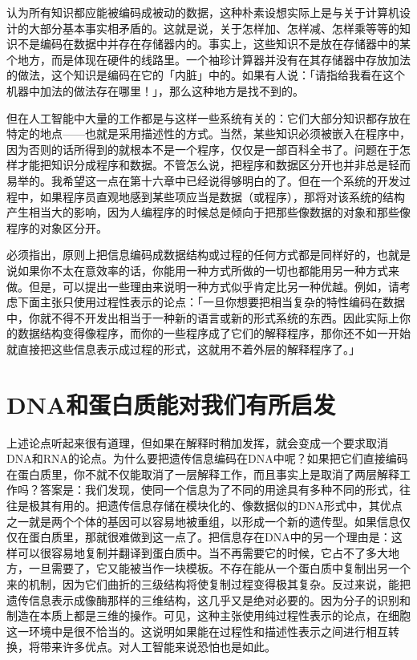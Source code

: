 \documentclass[
  12pt,
  twoside,
  openright,
  oldfontcommands,
]{memoir}
\begin{document}
认为所有知识都应能被编码成被动的数据，这种朴素设想实际上是与关于计算机设计的大部分基本事实相矛盾的。这就是说，关于怎样加、怎样减、怎样乘等等的知识不是编码在数据中并存在存储器内的。事实上，这些知识不是放在存储器中的某个地方，而是体现在硬件的线路里。一个袖珍计算器并没有在其存储器中存放加法的做法，这个知识是编码在它的「内脏」中的。如果有人说：「请指给我看在这个机器中加法的做法存在哪里！」，那么这种地方是找不到的。

但在人工智能中大量的工作都是与这样一些系统有关的：它们大部分知识都存放在特定的地点------也就是采用描述性的方式。当然，某些知识必须被嵌入在程序中，因为否则的话所得到的就根本不是一个程序，仅仅是一部百科全书了。问题在于怎样才能把知识分成程序和数据。不管怎么说，把程序和数据区分开也并非总是轻而易举的。我希望这一点在第十六章中已经说得够明白的了。但在一个系统的开发过程中，如果程序员直观地感到某些项应当是数据（或程序），那将对该系统的结构产生相当大的影响，因为人编程序的时候总是倾向于把那些像数据的对象和那些像程序的对象区分开。

必须指出，原则上把信息编码成数据结构或过程的任何方式都是同样好的，也就是说如果你不太在意效率的话，你能用一种方式所做的一切也都能用另一种方式来做。但是，可以提出一些理由来说明一种方式似乎肯定比另一种优越。例如，请考虑下面主张只使用过程性表示的论点：「一旦你想要把相当复杂的特性编码在数据中，你就不得不开发出相当于一种新的语言或新的形式系统的东西。因此实际上你的数据结构变得像程序，而你的一些程序成了它们的解释程序，那你还不如一开始就直接把这些信息表示成过程的形式，这就用不着外层的解释程序了。」

\section{DNA和蛋白质能对我们有所启发}

上述论点听起来很有道理，但如果在解释时稍加发挥，就会变成一个要求取消DNA和RNA的论点。为什么要把遗传信息编码在DNA中呢？如果把它们直接编码在蛋白质里，你不就不仅能取消了一层解释工作，而且事实上是取消了两层解释工作吗？答案是：我们发现，使同一个信息为了不同的用途具有多种不同的形式，往往是极其有用的。把遗传信息存储在模块化的、像数据似的DNA形式中，其优点之一就是两个个体的基因可以容易地被重组，以形成一个新的遗传型。如果信息仅仅在蛋白质里，那就很难做到这一点了。把信息存在DNA中的另一个理由是：这样可以很容易地复制并翻译到蛋白质中。当不再需要它的时候，它占不了多大地方，一旦需要了，它又能被当作一块模板。不存在能从一个蛋白质中复制出另一个来的机制，因为它们曲折的三级结构将使复制过程变得极其复杂。反过来说，能把遗传信息表示成像酶那样的三维结构，这几乎又是绝对必要的。因为分子的识别和制造在本质上都是三维的操作。可见，这种主张使用纯过程性表示的论点，在细胞这一环境中是很不恰当的。这说明如果能在过程性和描述性表示之间进行相互转换，将带来许多优点。对人工智能来说恐怕也是如此。
\end{document}

